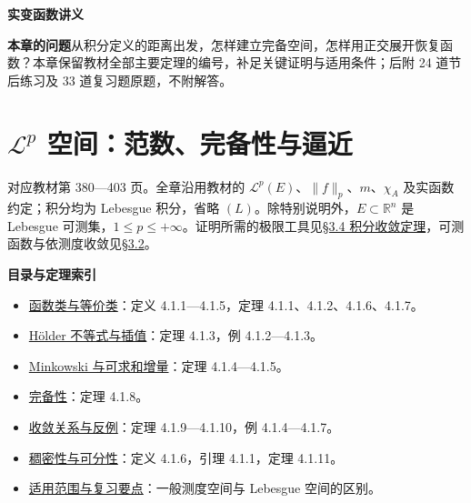 \documentclass[11pt,a4paper]{article}
\providecommand{\tightlist}{\setlength{\itemsep}{3pt}\setlength{\parskip}{0pt}}
\begin{document}
\begin{center}
{\LARGE\bfseries 实变函数讲义\par}
\vspace{8pt}{\large 第四章\quad 函数空间\par}
\vspace{6pt}{\small 依徐森林、薛春华《实变函数论》\quad 教材第 380—423 页\par}
\end{center}
\vspace{8pt}
\noindent\textbf{本章的问题}\quad 从积分定义的距离出发，怎样建立完备空间，怎样用正交展开恢复函数？本章保留教材全部主要定理的编号，补足关键证明与适用条件；后附 24 道节后练习及 33 道复习题原题，不附解答。
\tableofcontents\clearpage
\clearpage\section{\texorpdfstring{$\mathcal L^p$ 空间：范数、完备性与逼近}{Lp 空间：范数、完备性与逼近}}
\label{ch04-s1}
对应教材第 380---403 页。全章沿用教材的
\(\mathcal L^p(E)\)、\(\|f\|_p\)、\(m\)、\(\chi_A\)
及实函数约定；积分均为 Lebesgue 积分，省略
\((L)\)。除特别说明外，\(E\subset\mathbb R^n\) 是 Lebesgue
可测集，\(1\le p\le+\infty\)。证明所需的极限工具见\href{https://zj139.github.io/math-notes/notes/40e0912ec76652ea96838917/}{§3.4
积分收敛定理}，可测函数与依测度收敛见\href{https://zj139.github.io/math-notes/notes/1f3a19ea67c736860ad6ef85/}{§3.2}。

\textbf{目录与定理索引}

\begin{itemize}
\tightlist
\item
  \hyperref[ch04-s1-ux51fdux6570ux7c7bux4e0eux7b49ux4ef7ux7c7b]{函数类与等价类}：定义
  4.1.1---4.1.5，定理 4.1.1、4.1.2、4.1.6、4.1.7。
\item
  \hyperref[ch04-s1-huxf6lder-ux4e0dux7b49ux5f0fux4e0eux63d2ux503c]{Hölder
  不等式与插值}：定理 4.1.3，例 4.1.2---4.1.3。
\item
  \hyperref[ch04-s1-minkowski-ux4e0eux53efux6c42ux548cux589eux91cf]{Minkowski
  与可求和增量}：定理 4.1.4---4.1.5。
\item
  \hyperref[ch04-s1-ux5b8cux5907ux6027]{完备性}：定理 4.1.8。
\item
  \hyperref[ch04-s1-ux6536ux655bux5173ux7cfbux4e0eux53cdux4f8b]{收敛关系与反例}：定理
  4.1.9---4.1.10，例 4.1.4---4.1.7。
\item
  \hyperref[ch04-s1-ux7a20ux5bc6ux6027ux4e0eux53efux5206ux6027]{稠密性与可分性}：定义
  4.1.6，引理 4.1.1，定理 4.1.11。
\item
  \hyperref[ch04-s1-ux9002ux7528ux8303ux56f4ux4e0eux590dux4e60ux8981ux70b9]{适用范围与复习要点}：一般测度空间与
  Lebesgue 空间的区别。
\end{itemize}
\end{document}
